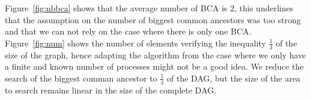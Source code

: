Figure~\ref{fig:nbbca} shows that the average number of BCA is $2$, this underlines that the assumption on the number of biggest common ancestors was too strong and that we can not rely on the case where there is only one BCA. Figure~\ref{fig:num} shows the number of elements verifying the inequality $\frac{1}{3}$ of the size of the graph, hence adapting the algorithm from the case where we only have a finite and known number of processes might not be a good idea. We reduce the search of the biggest comman ancestor to $\frac{1}{3}$ of the DAG, but the size of the area to search remains linear in the size of the complete DAG.
